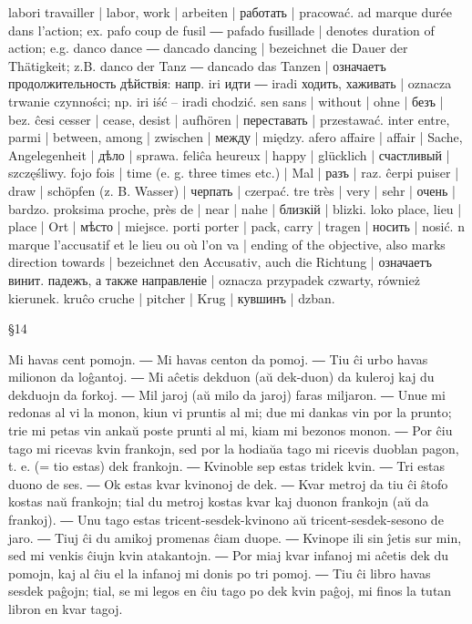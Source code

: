 labori travailler | labor, work | arbeiten | работать | pracować.
ad marque durée dans l’action; ex. pafo coup de fusil ― pafado fusillade | denotes duration of action; e.g. danco dance ― dancado dancing | bezeichnet die Dauer der Thätigkeit; z.B. danco der Tanz ― dancado das Tanzen | означаетъ продолжительность дѣйствія: напр. iri идти ― iradi ходить, хаживать | oznacza trwanie czynności; np. iri iść -- iradi chodzić.
sen sans | without | ohne | безъ | bez.
ĉesi cesser | cease, desist | aufhören | переставать | przestawać.
inter entre, parmi | between, among | zwischen | между | między.
afero affaire | affair | Sache, Angelegenheit | дѣло | sprawa.
feliĉa heureux | happy | glücklich | счастливый | szczęśliwy.
fojo fois | time (e. g. three times etc.) | Mal | разъ | raz.
ĉerpi puiser | draw | schöpfen (z. B. Wasser) | черпать | czerpać.
tre très | very | sehr | очень | bardzo.
proksima proche, près de | near | nahe | близкій | blizki.
loko place, lieu | place | Ort | мѣсто | miejsce.
porti porter | pack, carry | tragen | носить | nosić.
n marque l’accusatif et le lieu ou où l’on va | ending of the objective, also marks direction towards | bezeichnet den Accusativ, auch die Richtung | означаетъ винит. падежъ, а также направленіе | oznacza przypadek czwarty, również kierunek.
kruĉo cruche | pitcher | Krug | кувшинъ | dzban.

§14

Mi havas cent pomojn. ― Mi havas centon da pomoj. ― Tiu ĉi urbo havas milionon da loĝantoj. ― Mi aĉetis dekduon (aŭ dek-duon) da kuleroj kaj du dekduojn da forkoj. ― Mil jaroj (aŭ milo da jaroj) faras miljaron. ― Unue mi redonas al vi la monon, kiun vi pruntis al mi; due mi dankas vin por la prunto; trie mi petas vin ankaŭ poste prunti al mi, kiam mi bezonos monon. ― Por ĉiu tago mi ricevas kvin frankojn, sed por la hodiaŭa tago mi ricevis duoblan pagon, t. e. (= tio estas) dek frankojn. ― Kvinoble sep estas tridek kvin. ― Tri estas duono de ses. ― Ok estas kvar kvinonoj de dek. ― Kvar metroj da tiu ĉi ŝtofo kostas naŭ frankojn; tial du metroj kostas kvar kaj duonon frankojn (aŭ da frankoj). ― Unu tago estas tricent-sesdek-kvinono aŭ tricent-sesdek-sesono de jaro. ― Tiuj ĉi du amikoj promenas ĉiam duope. ― Kvinope ili sin ĵetis sur min, sed mi venkis ĉiujn kvin atakantojn. ― Por miaj kvar infanoj mi aĉetis dek du pomojn, kaj al ĉiu el la infanoj mi donis po tri pomoj. ― Tiu ĉi libro havas sesdek paĝojn; tial, se mi legos en ĉiu tago po dek kvin paĝoj, mi finos la tutan libron en kvar tagoj.

